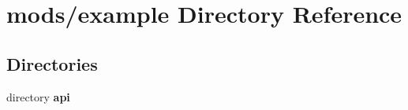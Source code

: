 \section{mods/example Directory Reference}
\label{dir_ac8b2b4f7357612469e8b0a218ec85d6}
\subsection*{Directories}
\begin{DoxyCompactItemize}
\item 
directory {\bf api}
\end{DoxyCompactItemize}
